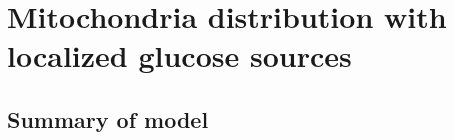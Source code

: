 \documentclass[12pt,letterpaper]{article}
\begin{document}


\section{Mitochondria distribution with localized glucose sources}

\subsection{Summary of model}
\end{document}
